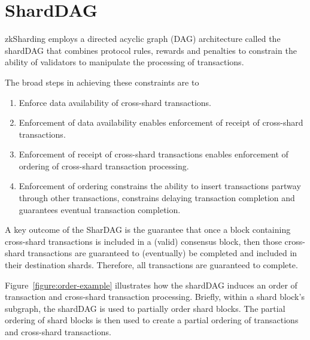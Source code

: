 \section{ShardDAG}
\label{section:shardDAG-intro}
zkSharding employs a directed acyclic graph (DAG) architecture called the shardDAG that combines 
 protocol rules, rewards and penalties to constrain the ability of validators to manipulate the processing of transactions.

The broad steps in achieving these constraints are to
\begin{enumerate}
	\item Enforce data availability of cross-shard transactions.
	\item Enforcement of data availability enables enforcement of receipt of cross-shard transactions.
	\item Enforcement of receipt of cross-shard transactions enables enforcement of ordering of cross-shard transaction processing.
	\item Enforcement of ordering constrains the ability to insert transactions partway through other transactions, constrains delaying transaction completion and guarantees eventual transaction completion.
\end{enumerate}

A key outcome of the SharDAG is the guarantee that once a block containing cross-shard transactions is included in a (valid) consensus block, then those cross-shard transactions are guaranteed to (eventually) be completed and included in their destination shards. 
Therefore, all transactions are guaranteed to complete.

Figure~\ref{figure:order-example} illustrates how the shardDAG induces an order of transaction and cross-shard transaction processing. Briefly, within a shard block's subgraph, the shardDAG is used to partially order shard blocks. The partial ordering of shard blocks is then used to create a partial ordering of transactions and cross-shard transactions.

